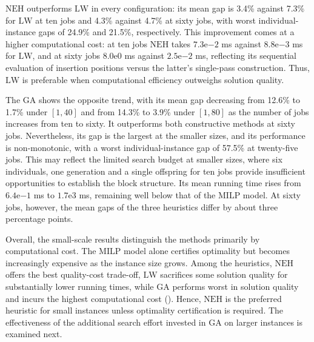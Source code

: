 ﻿\documentclass[12pt]{article} \textheight=24.5cm \textwidth=16.5cm \parskip = 0.165cm
\begin{document}
\begin{sloppypar}
        $\mathrm{NEH}$ outperforms $\mathrm{LW}$ in every configuration: its mean gap is 3.4\% against 7.3\% for $\mathrm{LW}$ at ten jobs and 4.3\% against 4.7\% at sixty jobs, with worst individual-instance gaps of 24.9\% and 21.5\%, respectively.
        This improvement comes at a higher computational cost: at ten jobs $\mathrm{NEH}$ takes $7.3\mathrm{e}{-2}$ ms against $8.8\mathrm{e}{-3}$ ms for $\mathrm{LW}$, and at sixty jobs $8.0\mathrm{e}0$ ms against $2.5\mathrm{e}{-2}$ ms, reflecting its sequential evaluation of insertion positions versus the latter's single-pass construction.
        Thus, $\mathrm{LW}$ is preferable when computational efficiency outweighs solution quality.

        The $\mathrm{GA}$ shows the opposite trend, with its mean gap decreasing from 12.6\% to 1.7\% under $[1,40]$ and from 14.3\% to 3.9\% under $[1,80]$ as the number of jobs increases from ten to sixty.
        It outperforms both constructive methods at sixty jobs.
        Nevertheless, its gap is the largest at the smaller sizes, and its performance is non-monotonic, with a worst individual-instance gap of 57.5\% at twenty-five jobs.
        This may reflect the limited search budget at smaller sizes, where six individuals, one generation and a single offspring for ten jobs provide insufficient opportunities to establish the block structure.
        Its mean running time rises from $6.4\mathrm{e}{-1}$ ms to $1.7\mathrm{e}3$ ms, remaining well below that of the $\mathrm{MILP}$ model.
        At sixty jobs, however, the mean gaps of the three heuristics differ by about three percentage points.

        Overall, the small-scale results distinguish the methods primarily by computational cost.
        The $\mathrm{MILP}$ model alone certifies optimality but becomes increasingly expensive as the instance size grows.
        Among the heuristics, $\mathrm{NEH}$ offers the best quality-cost trade-off, $\mathrm{LW}$ sacrifices some solution quality for substantially lower running times, while $\mathrm{GA}$ performs worst in solution quality and incurs the highest computational cost ().
        Hence, $\mathrm{NEH}$ is the preferred heuristic for small instances unless optimality certification is required.
        The effectiveness of the additional search effort invested in $\mathrm{GA}$ on larger instances is examined next.


\end{sloppypar}
\end{document}
